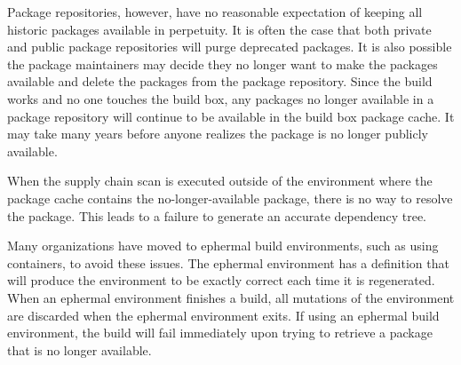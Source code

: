 Package repositories, however, have no reasonable expectation of keeping all historic packages
available in perpetuity.  It is often the case that both private and public package
repositories will purge deprecated packages.  It is also possible the package maintainers
may decide they no longer want to make the packages available and delete the packages
from the package repository.  Since the build works and no one touches the build box, 
any packages no longer available in a package repository will continue to be available in the
build box package cache.  It may take many years before anyone realizes the package
is no longer publicly available.

When the supply chain scan is executed outside of the environment where the package
cache contains the no-longer-available package, there is no way to resolve the package.
This leads to a failure to generate an accurate dependency tree.

Many organizations have moved to ephermal build environments, such as using containers, 
to avoid these issues.  The ephermal environment has a definition that will produce the
environment to be exactly correct each time it is regenerated.  When an ephermal environment
finishes a build, all mutations of the environment are discarded when the ephermal
environment exits.  If using an ephermal build environment, the build will fail immediately
upon trying to retrieve a package that is no longer available.

